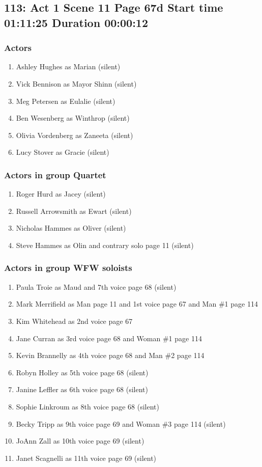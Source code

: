 \subsection{113: Act 1 Scene 11 Page 67d Start time 01:11:25 Duration 00:00:12}

\subsubsection{Actors}
\begin{enumerate}
\item Ashley Hughes as Marian (silent)
\item Vick Bennison as Mayor Shinn (silent)
\item Meg Petersen as Eulalie (silent)
\item Ben Wesenberg as Winthrop (silent)
\item Olivia Vordenberg as Zaneeta (silent)
\item Lucy Stover as Gracie (silent)
\end{enumerate}
\subsubsection{Actors in group Quartet}
\begin{enumerate}
\item Roger Hurd as Jacey (silent)
\item Russell Arrowsmith as Ewart (silent)
\item Nicholas Hammes as Oliver (silent)
\item Steve Hammes as Olin and contrary solo page 11 (silent)
\end{enumerate}
\subsubsection{Actors in group WFW soloists}
\begin{enumerate}
\item Paula Troie as Maud and 7th voice page 68 (silent)
\item Mark Merrifield as Man page 11 and 1st voice page 67 and Man \#1 page 114
\item Kim Whitehead as 2nd voice page 67
\item Jane Curran as 3rd voice page 68 and Woman \#1 page 114
\item Kevin Brannelly as 4th voice page 68 and Man \#2 page 114
\item Robyn Holley as 5th voice page 68 (silent)
\item Janine Leffler as 6th voice page 68 (silent)
\item Sophie Linkroum as 8th voice page 68 (silent)
\item Becky Tripp as 9th voice page 69 and Woman \#3 page 114 (silent)
\item JoAnn Zall as 10th voice page 69 (silent)
\item Janet Scagnelli as 11th voice page 69 (silent)
\end{enumerate}

